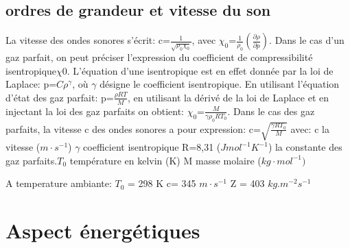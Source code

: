 \documentclass[a4paper, 12pt]{article}
\begin{document}
\subsection{ordres de grandeur et vitesse du son}
\begin{text}
La vitesse des ondes sonores s'écrit:\newline 
c=$\frac{1}{\sqrt{\rho_{0}\chi_{0}}}$, avec $\chi_{0}$=$\frac{1}{\rho_{0}}(\frac{\partial \rho}{\partial p})$.\newline 
Dans le cas d'un gaz parfait, on peut préciser l'expression du coefficient de compressibilité isentropique$\chi{0}$. L'équation d'une isentropique est en effet donnée par la loi de Laplace:\newline
p=$C\rho^{\gamma}$, où $\gamma$ désigne le coefficient isentropique.\newline 
En utilisant l'équation d'état des gaz parfait:\newline 
p=$\frac{\rho RT}{M}$, en utilisant la dérivé de la loi de Laplace et en injectant la loi des gaz parfaits on obtient:\newline 
$\chi_{0}$=$\frac{M}{\gamma \rho_{0}RT_{0}}$.\newline 
Dans le cas des gaz parfaits, la vitesse c des ondes sonores a pour expression:\newline 
c=$\sqrt{\frac{\gamma R T_{0}}{M}}$\newline 
avec: c la vitesse ($m\cdot s^{-1}$)\newline
$\gamma$ coefficient isentropique\newline 
R=8,31 ($Jmol^{-1}K^{-1}$) la constante des gaz parfaits.\newline $T_{0}$ température en kelvin (K)\newline 
M masse molaire ($kg\cdot mol^{-1})$\newline 

A temperature ambiante:\newline 
$T_{0}$ = 298 K\newline 
c= 345 $m\cdot s^{-1}$
Z = 403 $kg.m^{-2}s^{-1}$

\end{text}
\section{Aspect énergétiques}
\end{document}
